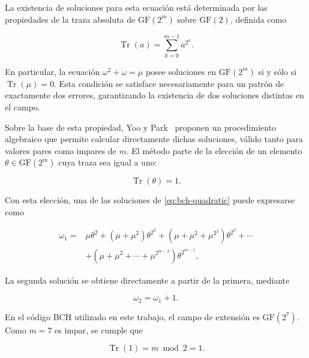 \documentclass[10pt,a4paper]{article}
\begin{document}
La existencia de soluciones para esta ecuación está
determinada por las propiedades de la traza absoluta de
$\mathrm{GF}(2^m)$ sobre $\mathrm{GF}(2)$, definida como

\begin{equation}
    \operatorname{Tr}(a)
    =
    \sum_{k=0}^{m-1}a^{2^k}.
    \label{eq:bch-trace}
\end{equation}

En particular, la ecuación $\omega^2+\omega=\mu$ posee
soluciones en $\mathrm{GF}(2^m)$ si y sólo si
$\operatorname{Tr}(\mu)=0$. Esta condición se satisface
necesariamente para un patrón de exactamente dos errores,
garantizando la existencia de dos soluciones distintas en
el campo.

Sobre la base de esta propiedad, Yoo y Park~\cite{yoo2014}
proponen un procedimiento algebraico que permite calcular
directamente dichas soluciones, válido tanto para valores
pares como impares de $m$. El método parte de la elección
de un elemento $\theta\in\mathrm{GF}(2^m)$ cuya traza
sea igual a uno:

\begin{equation}
    \operatorname{Tr}(\theta)=1.
\end{equation}

Con esta elección, una de las soluciones de
\eqref{eq:bch-quadratic} puede expresarse como

\begin{equation}
\begin{split}
    \omega_1 ={}&
    \mu\theta^2
    +(\mu+\mu^2)\theta^{2^2}
    +(\mu+\mu^2+\mu^{2^2})\theta^{2^3}
    +\cdots\\
    &+
    \left(
        \mu+\mu^2+\cdots+\mu^{2^{m-2}}
    \right)\theta^{2^{m-1}},
\end{split}
\label{eq:bch-omega1-searchless}
\end{equation}

La segunda solución se obtiene directamente a partir
de la primera, mediante

\begin{equation}
    \omega_2=\omega_1+1.
\end{equation}

En el código BCH utilizado en este trabajo, el campo
de extensión es $\mathrm{GF}(2^7)$. Como $m=7$ es impar,
se cumple que

\begin{equation}
    \operatorname{Tr}(1)=m\bmod2=1.
\end{equation}
\end{document}
